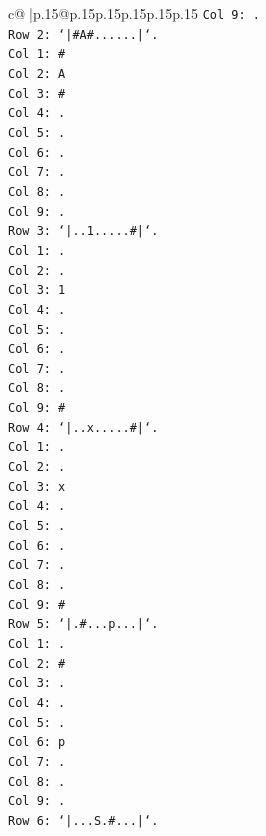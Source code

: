 \documentclass{article}
\begin{document}
{\begin{supertabular}{c@{$\;$}|p{.15\linewidth}@{}p{.15\linewidth}p{.15\linewidth}p{.15\linewidth}p{.15\linewidth}p{.15\linewidth}}
{{{\texttt{Col 9: .} \\
\texttt{Row 2: `|\#A\#......|`.} \\
\texttt{Col 1: \#} \\
\texttt{Col 2: A} \\
\texttt{Col 3: \#} \\
\texttt{Col 4: .} \\
\texttt{Col 5: .} \\
\texttt{Col 6: .} \\
\texttt{Col 7: .} \\
\texttt{Col 8: .} \\
\texttt{Col 9: .} \\
\texttt{Row 3: `|..1.....\#|`.} \\
\texttt{Col 1: .} \\
\texttt{Col 2: .} \\
\texttt{Col 3: 1} \\
\texttt{Col 4: .} \\
\texttt{Col 5: .} \\
\texttt{Col 6: .} \\
\texttt{Col 7: .} \\
\texttt{Col 8: .} \\
\texttt{Col 9: \#} \\
\texttt{Row 4: `|..x.....\#|`.} \\
\texttt{Col 1: .} \\
\texttt{Col 2: .} \\
\texttt{Col 3: x} \\
\texttt{Col 4: .} \\
\texttt{Col 5: .} \\
\texttt{Col 6: .} \\
\texttt{Col 7: .} \\
\texttt{Col 8: .} \\
\texttt{Col 9: \#} \\
\texttt{Row 5: `|.\#...p...|`.} \\
\texttt{Col 1: .} \\
\texttt{Col 2: \#} \\
\texttt{Col 3: .} \\
\texttt{Col 4: .} \\
\texttt{Col 5: .} \\
\texttt{Col 6: p} \\
\texttt{Col 7: .} \\
\texttt{Col 8: .} \\
\texttt{Col 9: .} \\
\texttt{Row 6: `|...S.\#...|`.} \\
}}}
\end{supertabular}}
\end{document}
